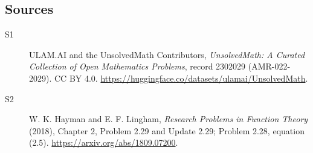 \documentclass[11pt]{article}
\begin{document}
\subsection{Sources}
\begin{description}
\item[\hypertarget{source:2302029:1}{S1}] ULAM.AI and the UnsolvedMath Contributors, \emph{UnsolvedMath: A Curated Collection of Open Mathematics Problems}, record 2302029 (AMR-022-2029). CC BY 4.0. \url{https://huggingface.co/datasets/ulamai/UnsolvedMath}.
\item[\hypertarget{source:2302029:2}{S2}] W. K. Hayman and E. F. Lingham, \emph{Research Problems in Function Theory} (2018), Chapter 2, Problem 2.29 and Update 2.29; Problem 2.28, equation (2.5). \url{https://arxiv.org/abs/1809.07200}.
\end{description}
\label{end:2302029}
\end{document}
